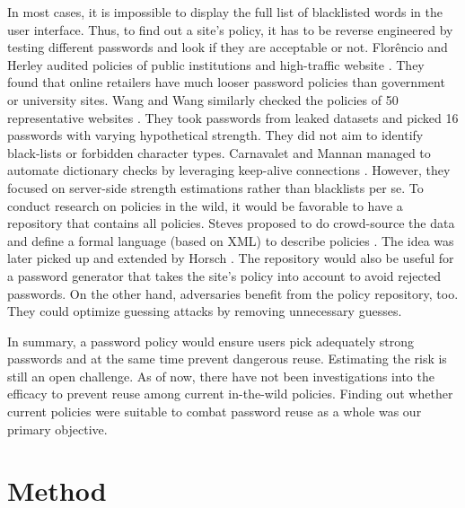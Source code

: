 In most cases, it is impossible to display the full list of blacklisted words in the user interface. Thus, to find out a site's policy, it has to be reverse engineered by testing different passwords and look if they are acceptable or not. Florêncio and Herley audited policies of public institutions and high-traffic website \cite{Florencio2010WhereDoPoliciesComeFrom}. They found that online retailers have much looser password policies than government or university sites. Wang and Wang similarly checked the policies of 50 representative websites \cite{Wang2015EmperorsPolicies}. They took passwords from leaked datasets and picked 16 passwords with varying hypothetical strength. They did not aim to identify black-lists or forbidden character types. Carnavalet and Mannan managed to automate dictionary checks by leveraging keep-alive connections \cite{Carnavalet2014AnalyzingPWStrengthMeters}. However, they focused on server-side strength estimations rather than blacklists per se. To conduct research on policies in the wild, it would be favorable to have a repository that contains all policies. Steves \etal proposed to do crowd-source the data and define a formal language (based on XML) to describe policies \cite{Steves2015PasswordPolicyLanguage}. The idea was later picked up and extended by Horsch \etal \cite{Horsch2016PasswordPolicyMarkup}. The repository would also be useful for a password generator that takes the site's policy into account to avoid rejected passwords. On the other hand, adversaries benefit from the policy repository, too. They could optimize guessing attacks by removing unnecessary guesses. 

In summary, a password policy would ensure users pick adequately strong passwords and at the same time prevent dangerous reuse. Estimating the risk is still an open challenge. As of now, there have not been investigations into the efficacy to prevent reuse among current in-the-wild policies. Finding out whether current policies were suitable to combat password reuse as a whole was our primary objective. 

\section{Method}


